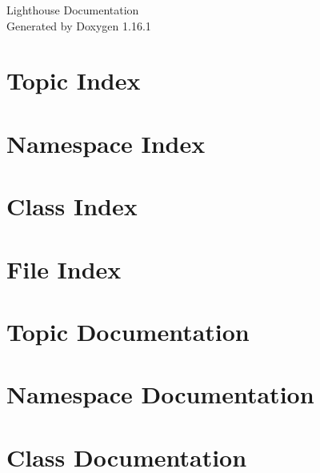\documentclass[twoside]{book}
\newcommand{\+}{\discretionary{\mbox{\scriptsize$\hookleftarrow$}}{}{}}
\newcommand{\clearemptydoublepage}{%
    \newpage{\pagestyle{empty}\cleardoublepage}%
  }
\begin{document}
  \raggedbottom
    \hypersetup{pageanchor=false,
                bookmarksnumbered=true,
                pdfencoding=unicode
               }
  \begin{titlepage}
  \vspace*{7cm}
  \begin{center}%
  {\Large Lighthouse Documentation}\\
  \vspace*{1cm}
  {\large Generated by Doxygen 1.16.1}\\
  \end{center}
  \end{titlepage}
  \clearemptydoublepage
  \tableofcontents
  \clearemptydoublepage
  \hypersetup{pageanchor=true}

\chapter{Topic Index}

\chapter{Namespace Index}

\chapter{Class Index}

\chapter{File Index}

\chapter{Topic Documentation}


\chapter{Namespace Documentation}

\chapter{Class Documentation}



\end{document}
